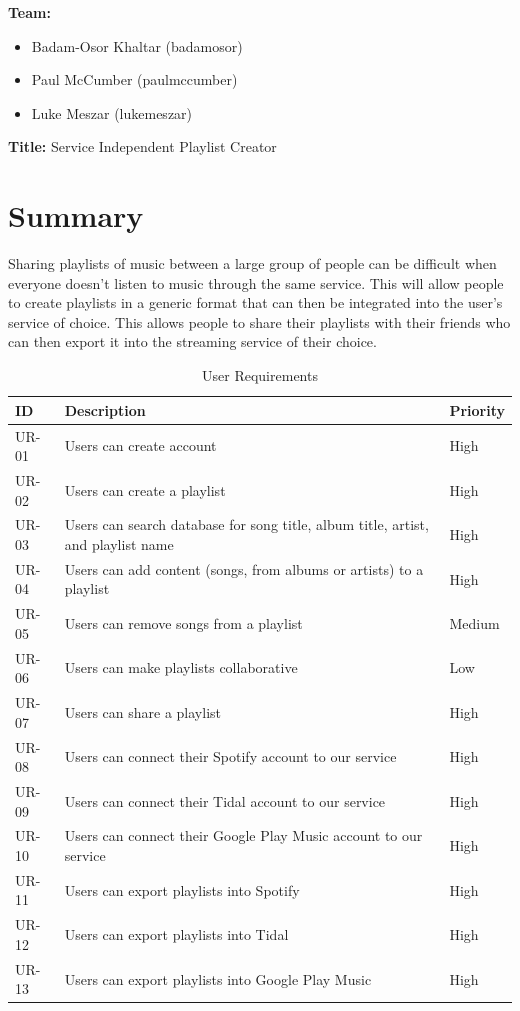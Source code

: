 \documentclass[12pt]{article}
\begin{document}
	\noindent
	\textbf{Team:}
   	 \begin{itemize}[leftmargin=0.0cm,labelsep=0.2cm]
   	 	\item[] Badam-Osor Khaltar (badamosor)
   	 	\item[] Paul McCumber (paulmccumber)
   	 	\item[] Luke Meszar (lukemeszar)
   	 \end{itemize}
    \noindent
    \textbf{Title:} Service Independent Playlist Creator
	\section*{Summary}
	Sharing playlists of music between a large group of people can be difficult when
	everyone doesn't listen to music through the same service. This will allow people to create
	playlists in a generic format that can then be integrated into the user’s service of choice. This allows people to share their playlists with their friends who can then export it into the streaming service of their choice. 
	\begin{table}[H]
		\centering
		\label{tab:ur}
		\caption*{User Requirements}
		\begin{tabularx}{450pt}{lXl}
			ID & Description & Priority\\\hline
			UR-01 & Users can create account & High \\
			UR-02 & Users can create a playlist & High \\
			UR-03 & Users can search database for song title, album title,
			artist, and playlist name & High \\
			UR-04 & Users can add content (songs, from albums or artists) to a playlist & High \\
			UR-05 & Users can remove songs from a playlist & Medium \\
			UR-06 & Users can make playlists collaborative & Low \\
			UR-07 & Users can share a playlist & High \\
			UR-08 & Users can connect their Spotify account to our service & High \\
			UR-09 & Users can connect their Tidal account to our service & High \\
			UR-10 & Users can connect their Google Play Music account to our service & High \\
			UR-11 & Users can export playlists into Spotify & High \\
			UR-12 & Users can export playlists into Tidal & High \\
			UR-13 & Users can export playlists into Google Play Music & High \\
		\end{tabularx}
	\end{table}
\end{document}
